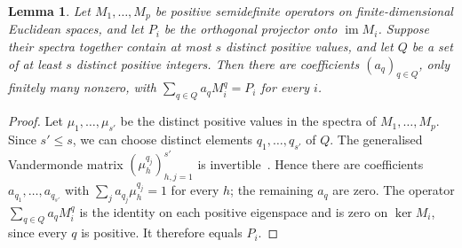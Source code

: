 \documentclass[10pt,a4paper]{article}
\theoremstyle{plain}
\newtheorem{lemma}[theorem]{Lemma}
\theoremstyle{definition}
\DeclareMathOperator{\im}{im}
\begin{document}
\begin{lemma}\label{lem:positive-interpolation}
 Let $M_1,\ldots,M_p$ be positive semidefinite operators on finite-dimensional
 Euclidean spaces, and let $P_i$ be the orthogonal projector onto $\im M_i$.
 Suppose their spectra together contain at most $s$ distinct positive values,
 and let $Q$ be a set of at least $s$ distinct positive integers.
 Then there are coefficients $(a_q)_{q\in Q}$, only finitely many nonzero,
 with $\sum_{q\in Q}a_qM_i^q=P_i$ for every $i$.
\end{lemma}
\begin{proof}
 Let $\mu_1,\ldots,\mu_{s'}$ be the distinct positive
 values in the spectra of $M_1,\ldots,M_p$.
 Since $s'\leq s$, we can choose distinct elements $q_1,\ldots,q_{s'}$ of $Q$.
 The generalised Vandermonde matrix $(\mu_h^{q_j})_{h,j=1}^{s'}$ is
 invertible~\cite[p.~76]{GantmacherKrein2002}.
 Hence there are coefficients $a_{q_1},\ldots,a_{q_{s'}}$ with
 $\sum_ja_{q_j}\mu_h^{q_j}=1$ for every $h$; the remaining $a_q$ are zero.
 The operator $\sum_{q\in Q}a_qM_i^q$ is the identity on each positive
 eigenspace and is zero on $\ker M_i$, since every $q$ is positive.
 It therefore equals $P_i$.
\end{proof}
\end{document}
